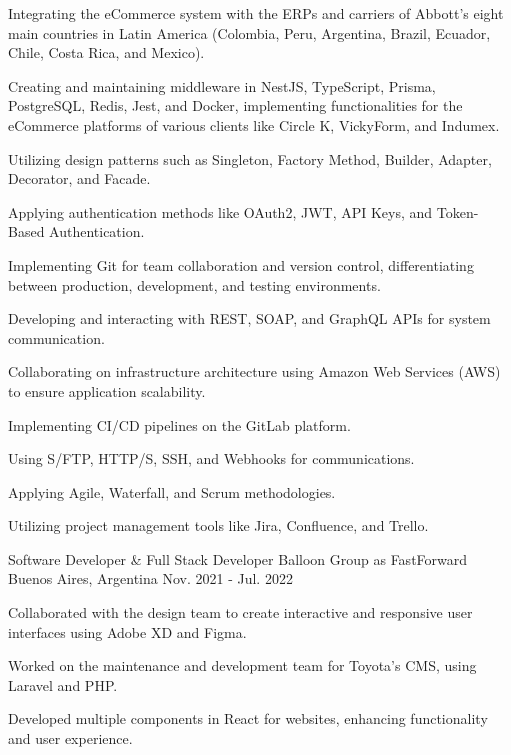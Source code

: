 \begin{cventries}
{\begin{cvitems}
        \item {Integrating the eCommerce system with the ERPs and carriers of Abbott's eight main countries in Latin America (Colombia, Peru, Argentina, Brazil, Ecuador, Chile, Costa Rica, and Mexico).}
        \item {Creating and maintaining middleware in NestJS, TypeScript, Prisma, PostgreSQL, Redis, Jest, and Docker, implementing functionalities for the eCommerce platforms of various clients like Circle K, VickyForm, and Indumex.}
        \item {Utilizing design patterns such as Singleton, Factory Method, Builder, Adapter, Decorator, and Facade.}
        \item {Applying authentication methods like OAuth2, JWT, API Keys, and Token-Based Authentication.}
        \item {Implementing Git for team collaboration and version control, differentiating between production, development, and testing environments.}
        \item {Developing and interacting with REST, SOAP, and GraphQL APIs for system communication.}
        \item {Collaborating on infrastructure architecture using Amazon Web Services (AWS) to ensure application scalability.}
        \item {Implementing CI/CD pipelines on the GitLab platform.}
        \item {Using S/FTP, HTTP/S, SSH, and Webhooks for communications.}
        \item {Applying Agile, Waterfall, and Scrum methodologies.}
        \item {Utilizing project management tools like Jira, Confluence, and Trello.}
      \end{cvitems}
    }
  \vspace{5.5mm}
  \cventry
    {Software Developer \& Full Stack Developer} %
    {Balloon Group as FastForward} %
    {Buenos Aires, Argentina} %
    {Nov. 2021 - Jul. 2022} %
    {
      \begin{cvitems} %
        \item {Collaborated with the design team to create interactive and responsive user interfaces using Adobe XD and Figma.}
        \item {Worked on the maintenance and development team for Toyota's CMS, using Laravel and PHP.}
        \item {Developed multiple components in React for websites, enhancing functionality and user experience.}

\end{cvitems}}
\end{cventries}
